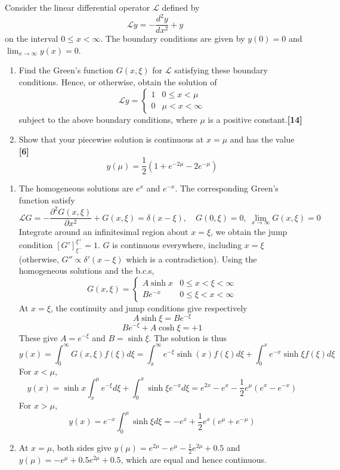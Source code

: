 \documentclass[a4paper]{article}
\begin{document}
\newpage
\begin{qns}
Consider the linear differential operator $\mathcal{L}$ defined by
$$\mathcal{L}y=-\frac{d^2y}{dx^2}+y$$
on the interval $0\leq x<\infty$. The boundary conditions are given by $y(0) = 0$ and $\lim_{x\rightarrow\infty}y(x)=0$.
\begin{enumerate}[label=(\alph*)]
\item  Find the Green’s function $G(x,\xi)$ for $\mathcal{L}$ satisfying these boundary conditions. Hence, or otherwise, obtain the solution of
$$\mathcal{L}y=
\left\{
        \begin{array}{ll}
      1 & 0\leq x<\mu \\
      0 & \mu<x<\infty
        \end{array}
    \right.$$
subject to the above boundary conditions, where $\mu$ is a positive constant.\hfill\textbf{[14]}
\item Show that your piecewise solution is continuous at $x=\mu$ and has the value \hfill\textbf{[6]}
$$y(\mu)=\frac{1}{2}(1+e^{-2\mu}-2e^{-\mu})$$
\end{enumerate}
\end{qns}
\begin{ans}\leavevmode
\begin{enumerate}[label=(\alph*)]
    \item The homogeneous solutions are $e^x$ and $e^{-x}$. The corresponding Green's function satisfy 
    $$\mathcal{L}G=-\frac{\partial^2G(x,\xi)}{\partial x^2}+G(x,\xi)=\delta(x-\xi),\quad G(0,\xi)=0,~\lim_{x\rightarrow\infty}G(x,\xi)=0$$
    Integrate around an infinitesimal region about $x=\xi$, we obtain the jump condition $[G']_{\xi^-}^{\xi^+}=1$. $G$ is continuous everywhere, including $x=\xi$ (otherwise, $G''\propto\delta'(x-\xi)$ which is a contradiction). Using the homogeneous solutions and the b.c.s,
    $$G(x,\xi)=
\left\{
        \begin{array}{ll}
      A\sinh x & 0\leq x<\xi<\infty \\
      Be^{-x} & 0\leq\xi<x<\infty
        \end{array}
    \right.$$
At $x=\xi$, the continuity and jump conditions give respectively
$$A\sinh\xi=Be^{-\xi}$$
$$Be^{-\xi}+A\cosh\xi=+1$$
These give $A=e^{-\xi}$ and $B=\sinh\xi$. The solution is thus
$$y(x)=\int_0^\infty G(x,\xi)f(\xi)d\xi=\int_x^\infty e^{-\xi}\sinh(x)f(\xi)d\xi+\int_0^xe^{-x}\sinh\xi f(\xi)d\xi$$
For $x<\mu$, 
$$y(x)=\sinh x\int_x^\mu e^{-\xi}d\xi+\int_0^x\sinh\xi e^{-x}d\xi=e^{2x}-e^x-\frac{1}{2}e^\mu(e^x-e^{-x})$$
For $x>\mu$,
$$y(x)=e^{-x}\int_0^\mu\sinh\xi d\xi=-e^x+\frac{1}{2}e^x(e^\mu+e^{-\mu})$$
\item At $x=\mu$, both sides give $y(\mu)=e^{2\mu}-e^\mu-\frac{1}{2}e^{2\mu}+0.5$ and $y(\mu)=-e^\mu+0.5e^{2\mu}+0.5$, which are equal and hence continuous.
\end{enumerate}
\end{ans}
\end{document}
